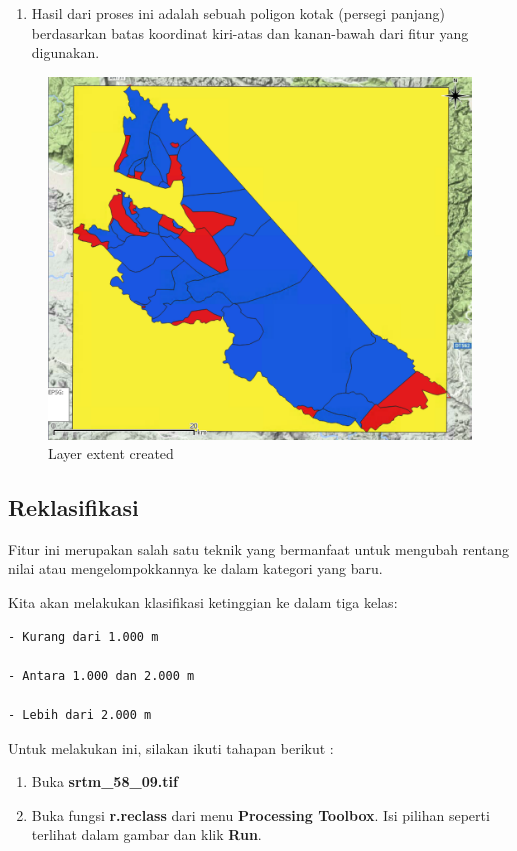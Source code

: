 \documentclass[]{book}
\providecommand{\tightlist}{%
  \setlength{\itemsep}{0pt}\setlength{\parskip}{0pt}}
\begin{document}
\begin{enumerate}
\def\labelenumi{\arabic{enumi}.}
\setcounter{enumi}{2}
\tightlist
\item
  Hasil dari proses ini adalah sebuah poligon kotak (persegi panjang) berdasarkan batas koordinat kiri-atas dan kanan-bawah dari fitur yang digunakan.
\end{enumerate}

\begin{figure}

{\centering \includegraphics[width=0.7\linewidth]{images/04/fig23} 

}

\caption{Layer extent created}\label{fig:fig1423}
\end{figure}

\hypertarget{reklasifikasi}{%
\subsection{Reklasifikasi}\label{reklasifikasi}}

Fitur ini merupakan salah satu teknik yang bermanfaat untuk mengubah rentang nilai atau mengelompokkannya ke dalam kategori yang baru.

Kita akan melakukan klasifikasi ketinggian ke dalam tiga kelas:

\begin{verbatim}
- Kurang dari 1.000 m

- Antara 1.000 dan 2.000 m

- Lebih dari 2.000 m
\end{verbatim}

Untuk melakukan ini, silakan ikuti tahapan berikut :

\begin{enumerate}
\def\labelenumi{\arabic{enumi}.}
\item
  Buka \textbf{srtm\_58\_09.tif}
\item
  Buka fungsi \textbf{r.reclass} dari menu \textbf{Processing Toolbox}. Isi pilihan seperti terlihat dalam gambar dan klik \textbf{Run}.
\end{enumerate}
\end{document}
